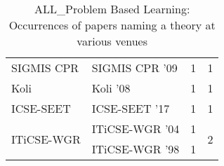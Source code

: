 \begin{table*}[t]
\begin{tabular}{llrr}
\multirow{1}{*}{SIGMIS CPR } & SIGMIS CPR '09 & 1 & \multirow{1}{*}{1}\\
\multirow{1}{*}{Koli } & Koli '08 & 1 & \multirow{1}{*}{1}\\
\multirow{1}{*}{ICSE-SEET } & ICSE-SEET '17 & 1 & \multirow{1}{*}{1}\\
\multirow{2}{*}{ITiCSE-WGR } & ITiCSE-WGR '04 & 1 & \multirow{2}{*}{2}\\
& ITiCSE-WGR '98 & 1 &\\
\end{tabular}
\caption{ALL\_Problem Based Learning: Occurrences of papers naming a theory at various venues}
\end{table*}